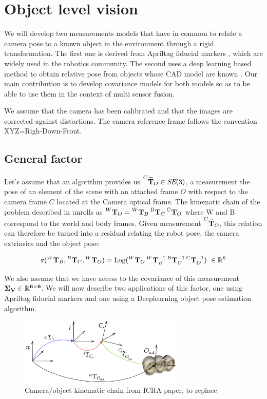 \chapter{Object level vision}
\minitoc

We will develop two measurements models that have in common to relate a camera pose to a known object in the environment through a rigid transformation. The first one 
is derived from Apriltag fiducial markers \cite{wang2016iros}, which are widely used in the robotics community. The second uses a deep learning based method
to obtain relative pose from objects whose CAD model are known \cite{labbe2020cosypose}. Our main contribution is to develop covariance models for both
models so as to be able to use them in the context of multi sensor fusion.

We assume that the camera has been calibrated and that the images are corrected against distortions. The camera reference frame
follows the convention XYZ=Righ-Down-Front.

\section{General factor}
Let's assume that an algorithm provides us $\prescript{C}{}{\widetilde{{\bf T}}}_{O} \in \textit{SE}(3)$, a measurement the pose of an element 
of the scene with an attached frame $O$ with respect to the camera frame $C$ located at the Camera optical frame.
The kinematic chain of the problem described in  unrolls as 
$\prescript{W}{}{{\bf T}}_{O} = \prescript{W}{}{{\bf T}}_{B}\prescript{B}{}{{\bf T}}_{C}\prescript{C}{}{{\bf T}}_{O}$ where W and B correspond to the world and body frames.
Given measurement $\prescript{C}{}{\widetilde{{\bf T}}}_{O}$, this relation can therefore be turned into a residual relating 
the robot pose, the camera extrinsics and the object pose:

\begin{equation}
    {\bf r} (\prescript{W}{}{{\bf T}}_{B}, \prescript{B}{}{{\bf T}}_{C}, \prescript{W}{}{{\bf T}}_{O}) = \operatorname*{Log}(\prescript{W}{}{{\bf T}}_{O} \prescript{W}{}{{\bf T}}_{B}^{-1} \prescript{B}{}{{\bf T}}_{C}^{-1} \prescript{C}{}{{\bf T}}_{O}^{-1}) ~ \in \mathbb{R}^6
\end{equation}

We also assume that we have access to the covariance of this measurement 
$\bf \Sigma_V \in \mathbb{R}^{6 \times 6}$. We will now describe two applications of this factor, one using Apriltag fiducial markers and one using 
a Deeplearning object pose estimation algorithm.

\begin{figure}
    \centering
    \includegraphics[width=0.7\textwidth]{figures/fig_kinematic_Cesar.png}
    \caption{Camera/object kinematic chain from ICRA paper, to replace }
    \label{fig:camera_object_chain}
\end{figure}


